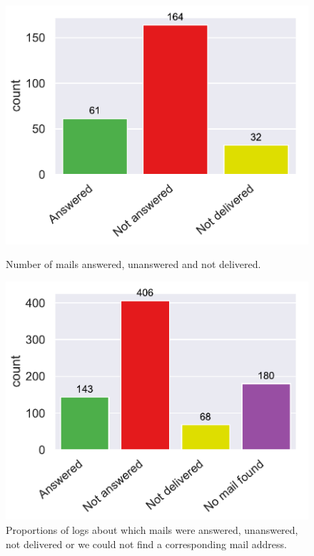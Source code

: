 \documentclass[\myrootdir/main.tex]{subfiles}
\begin{document}
\begin{figure}[htbp]
	\centering
	\begin{minipage}{0.45\textwidth}
		\centering
		\includegraphics[width=\textwidth, clip]{img/dev-mails/answers-received-mails.pdf}
		\caption{Number of mails answered, unanswered and not delivered.}
		\label{fig:mails-answers-received-mails}
	\end{minipage}\hfill
	\begin{minipage}{0.45\textwidth}
		\centering
		\includegraphics[width=\textwidth, clip]{img/dev-mails/answers-received-builds.pdf}
		\caption{Proportions of logs about which mails were answered, unanswered, not delivered or we could not find a corresponding mail address.}
		\label{fig:mails-answers-received-builds}
	\end{minipage}
\end{figure}
\end{document}
